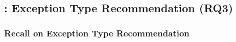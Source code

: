 \subsection{{\xtype}: Exception Type Recommendation (RQ3)}
\label{sec:rq3}


\subsubsection{{\bf Recall on Exception Type Recommendation}}
\label{sec:req3-recall}

